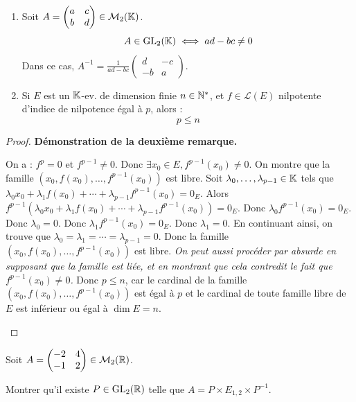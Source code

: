 \documentclass[12pt, a4paper]{report}
\begin{document}

\begin{remark}
    \begin{enumerate}
        \item Soit $A = \left(\begin{matrix} a & c \\ b & d\end{matrix}\right) \in \mathcal M_2(\mathbb{K})$.
        $$A \in \mathrm{GL}_2(\mathbb{K}) \iff ad - bc \ne 0$$
        Dans ce cas, $A^{-1} = \frac{1}{ad - bc} \left(\begin{matrix} d & -c \\ -b & a \end{matrix}\right)$.
        \item Si $E$ est un $\mathbb{K}$-ev. de dimension finie $n \in \mathbb{N}^*$, et $f \in \mathcal L(E)$ nilpotente d'indice de nilpotence égal à $p$, alors :
        $$p \le n$$
    \end{enumerate}
\end{remark}

\begin{proof}
    \textbf{Démonstration de la deuxième remarque.}

    \begin{outline}
    \1 On a : $f^p = 0$ et $f^{p-1} \ne 0$.
    \1 Donc $\exists x_0 \in E, f^{p-1}(x_0) \ne 0$.
    \1 On montre que la famille $(x_0, f(x_0), \dots, f^{p-1}(x_0))$ est libre.
    \2 Soit $\lambda_0,\dots,\lambda_{p-1} \in \mathbb{K}$ tels que $\lambda_0 x_0 + \lambda_1 f(x_0) + \cdots + \lambda_{p-1} f^{p-1}(x_0) = 0_E$.
    \2 Alors $f^{p-1}(\lambda_0 x_0 + \lambda_1 f(x_0) + \cdots + \lambda_{p-1} f^{p-1}(x_0)) = 0_E$.
    \2 Donc $\lambda_0 f^{p-1}(x_0) = 0_E$.
    \2 Donc $\lambda_0 = 0$.
    \2 Donc $\lambda_1 f^{p-1}(x_0) = 0_E$.
    \2 Donc $\lambda_1 = 0$.
    \2 En continuant ainsi, on trouve que $\lambda_0 = \lambda_1 = \cdots = \lambda_{p-1} = 0$.
    \2 Donc la famille $(x_0, f(x_0), \dots, f^{p-1}(x_0))$ est libre. \textit{On peut aussi procéder par absurde en supposant que la famille est liée, et en montrant que cela contredit le fait que $f^{p-1}(x_0) \ne 0$.}
    \2 Donc $p \le n$, car le cardinal de la famille $(x_0, f(x_0), \dots, f^{p-1}(x_0))$ est égal à $p$ et le cardinal de toute famille libre de $E$ est inférieur ou égal à $\dim E = n$.
    \end{outline}
\end{proof}

\begin{example}
    Soit $A = \left(\begin{matrix} -2 & 4 \\ -1 & 2 \end{matrix}\right) \in \mathcal M_2(\mathbb{R})$.

    Montrer qu'il existe $P \in \mathrm{GL}_2(\mathbb{R})$ telle que $A = P \times E_{1,2} \times P^{-1}$.
\end{example}
\end{document}
